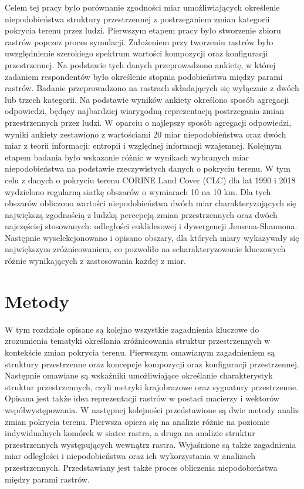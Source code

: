 \documentclass{amuthesis}
\begin{document}
Celem tej pracy było porównanie zgodności miar umożliwiających
określenie niepodobieństwa struktury przestrzennej z postrzeganiem zmian
kategorii pokrycia terenu przez ludzi. Pierwszym etapem pracy było
stworzenie zbioru rastrów poprzez proces symulacji. Założeniem przy
tworzeniu rastrów było uwzględnienie szerokiego spektrum wartości
kompozycji oraz konfiguracji przestrzennej. Na podstawie tych danych
przeprowadzono ankietę, w której zadaniem respondentów było określenie
stopnia podobieństwa między parami rastrów. Badanie przeprowadzono na
rastrach składających się wyłącznie z dwóch lub trzech kategorii. Na
podstawie wyników ankiety określono sposób agregacji odpowiedzi, będący
najbardziej wiarygodną reprezentacją postrzegania zmian przestrzennych
przez ludzi. W oparciu o najlepszy sposób agregacji odpowiedzi, wyniki
ankiety zestawiono z wartościami 20 miar niepodobieństwa oraz dwóch miar
z teorii informacji: entropii i względnej informacji wzajemnej. Kolejnym
etapem badania było wskazanie różnic w wynikach wybranych miar
niepodobieństwa na podstawie rzeczywistych danych o pokryciu terenu. W
tym celu z danych o pokryciu terenu CORINE Land Cover (CLC) dla lat 1990
i 2018 wydzielono regularną siatkę obszarów o wymiarach 10 na 10 km. Dla
tych obszarów obliczono wartości niepodobieństwa dwóch miar
charakteryzujących się największą zgodnością z ludzką percepcją zmian
przestrzennych oraz dwóch najczęściej stosowanych: odległości
euklidesowej i dywergencji Jensena-Shannona. Następnie wyselekcjonowano
i opisano obszary, dla których miary wykazywały się największym
zróżnicowaniem, co pozwoliło na scharakteryzowanie kluczowych różnic
wynikających z zastosowania każdej z miar.


\hypertarget{sec-metody}{%
\chapter{Metody}\label{sec-metody}}

W tym rozdziale opisane są kolejno wszystkie zagadnienia kluczowe do
zrozumienia tematyki określania zróżnicowania struktur przestrzennych w
kontekście zmian pokrycia terenu. Pierwszym omawianym zagadnieniem są
struktury przestrzenne oraz koncepcje kompozycji oraz konfiguracji
przestrzennej. Następnie omawiane są wskaźniki umożliwiające określanie
charakterystyk struktur przestrzennych, czyli metryki krajobrazowe oraz
sygnatury przestrzenne. Opisana jest także idea reprezentacji rastrów w
postaci macierzy i wektorów współwystępowania. W następnej kolejności
przedstawione są dwie metody analiz zmian pokrycia terenu. Pierwsza
opiera się na analizie różnic na poziomie indywidualnych komórek w
siatce rastra, a druga na analizie struktur przestrzennych występujących
wewnątrz rastra. Wyjaśnione są także zagadnienia miar odległości i
niepodobieństwa oraz ich wykorzystania w analizach przestrzennych.
Przedstawiany jest także proces obliczenia niepodobieństwa między parami
rastrów.
\end{document}
